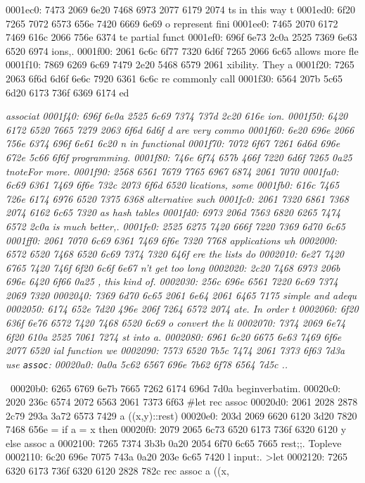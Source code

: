 \begin{bo
00010e0: 7865 647d 5c62 6567 696e 7b76 6572 6261  xed}
\begin{verba
00010f0: 7469 6d7d 0a20 2023 7479 7065 2074 6572  tim}
\begin{
0001c40: 7665 7262 6174 696d 7d0a 2020 236c 6574  verbatim}
0001ec0: 7473 2069 6e20 7468 6973 2077 6179 2074  ts in this way t
0001ed0: 6f20 7265 7072 6573 656e 7420 6669 6e69  o represent fini
0001ee0: 7465 2070 6172 7469 616c 2066 756e 6374  te partial funct
0001ef0: 696f 6e73 2c0a 2525 7369 6e63 6520 6974  ions,.%
0001f00: 2061 6c6c 6f77 7320 6d6f 7265 2066 6c65   allows more fle
0001f10: 7869 6269 6c69 7479 2e20 5468 6579 2061  xibility. They a
0001f20: 7265 2063 6f6d 6d6f 6e6c 7920 6361 6c6c  re commonly call
0001f30: 6564 207b 5c65 6d20 6173 736f 6369 6174  ed {\em associat
0001f40: 696f 6e0a 2525 6c69 7374 737d 2c20 616e  ion.%
0001f50: 6420 6172 6520 7665 7279 2063 6f6d 6d6f  d are very commo
0001f60: 6e20 696e 2066 756e 6374 696f 6e61 6c20  n in functional 
0001f70: 7072 6f67 7261 6d6d 696e 672e 5c66 6f6f  programming.\foo
0001f80: 746e 6f74 657b 466f 7220 6d6f 7265 0a25  tnote{For more.%
0001f90: 2568 6561 7679 7765 6967 6874 2061 7070  %
0001fa0: 6c69 6361 7469 6f6e 732c 2073 6f6d 6520  lications, some 
0001fb0: 616c 7465 726e 6174 6976 6520 7375 6368  alternative such
0001fc0: 2061 7320 6861 7368 2074 6162 6c65 7320   as hash tables 
0001fd0: 6973 206d 7563 6820 6265 7474 6572 2c0a  is much better,.
0001fe0: 2525 6275 7420 666f 7220 7369 6d70 6c65  %
0001ff0: 2061 7070 6c69 6361 7469 6f6e 7320 7768   applications wh
0002000: 6572 6520 7468 6520 6c69 7374 7320 646f  ere the lists do
0002010: 6e27 7420 6765 7420 746f 6f20 6c6f 6e67  n't get too long
0002020: 2c20 7468 6973 206b 696e 6420 6f66 0a25  , this kind of.%
0002030: 256c 696e 6561 7220 6c69 7374 2069 7320  %
0002040: 7369 6d70 6c65 2061 6e64 2061 6465 7175  simple and adequ
0002050: 6174 652e 7d20 496e 206f 7264 6572 2074  ate.} In order t
0002060: 6f20 636f 6e76 6572 7420 7468 6520 6c69  o convert the li
0002070: 7374 2069 6e74 6f20 610a 2525 7061 7274  st into a.%
0002080: 6961 6c20 6675 6e63 7469 6f6e 2077 6520  ial function we 
0002090: 7573 6520 7b5c 7474 2061 7373 6f63 7d3a  use {\tt assoc}:
00020a0: 0a0a 5c62 6567 696e 7b62 6f78 6564 7d5c  ..\begin{boxed}\
00020b0: 6265 6769 6e7b 7665 7262 6174 696d 7d0a  begin{verbatim}.
00020c0: 2020 236c 6574 2072 6563 2061 7373 6f63    #let rec assoc
00020d0: 2061 2028 2878 2c79 293a 3a72 6573 7429   a ((x,y)::rest)
00020e0: 203d 2069 6620 6120 3d20 7820 7468 656e   = if a = x then
00020f0: 2079 2065 6c73 6520 6173 736f 6320 6120   y else assoc a 
0002100: 7265 7374 3b3b 0a20 2054 6f70 6c65 7665  rest;;.  Topleve
0002110: 6c20 696e 7075 743a 0a20 203e 6c65 7420  l input:.  >let 
0002120: 7265 6320 6173 736f 6320 6120 2828 782c  rec assoc a ((x,

\end{boxed}}
\end{
0001c40: 7665 7262 6174 696d 7d0a 2020 236c 6574  verbatim}
\end{verba
00010f0: 7469 6d7d 0a20 2023 7479 7065 2074 6572  tim}
\end{bo
00010e0: 7865 647d 5c62 6567 696e 7b76 6572 6261  xed}
